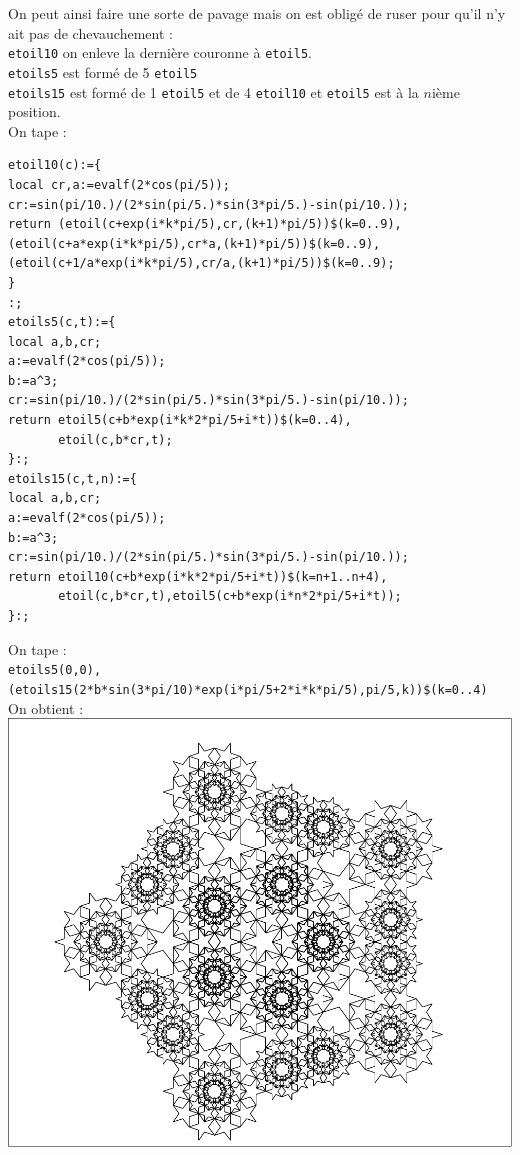 \documentclass[a4paper,11pt]{book}
\begin{document}
On peut ainsi faire une sorte de pavage mais on est oblig\'e de ruser pour qu'il
n'y ait pas de chevauchement :\\
{\tt etoil10} on enleve la derni\`ere couronne \`a {\tt etoil5}.\\
{\tt etoils5} est form\'e de 5 {\tt etoil5}\\
{\tt etoils15} est form\'e de 1 {\tt etoil5} et de 4 {\tt etoil10} et 
{\tt etoil5} est \`a la $n$i\`eme position.\\
On tape :\\
\begin{verbatim}
etoil10(c):={
local cr,a:=evalf(2*cos(pi/5));
cr:=sin(pi/10.)/(2*sin(pi/5.)*sin(3*pi/5.)-sin(pi/10.));
return (etoil(c+exp(i*k*pi/5),cr,(k+1)*pi/5))$(k=0..9),
(etoil(c+a*exp(i*k*pi/5),cr*a,(k+1)*pi/5))$(k=0..9),
(etoil(c+1/a*exp(i*k*pi/5),cr/a,(k+1)*pi/5))$(k=0..9);
}
:;
etoils5(c,t):={
local a,b,cr;
a:=evalf(2*cos(pi/5));
b:=a^3;
cr:=sin(pi/10.)/(2*sin(pi/5.)*sin(3*pi/5.)-sin(pi/10.));
return etoil5(c+b*exp(i*k*2*pi/5+i*t))$(k=0..4),
       etoil(c,b*cr,t);
}:;
etoils15(c,t,n):={
local a,b,cr;
a:=evalf(2*cos(pi/5));
b:=a^3;
cr:=sin(pi/10.)/(2*sin(pi/5.)*sin(3*pi/5.)-sin(pi/10.));
return etoil10(c+b*exp(i*k*2*pi/5+i*t))$(k=n+1..n+4),
       etoil(c,b*cr,t),etoil5(c+b*exp(i*n*2*pi/5+i*t));
}:;
\end{verbatim}
On tape :\\
{\tt etoils5(0,0),(etoils15(2*b*sin(3*pi/10)*exp(i*pi/5+2*i*k*pi/5),pi/5,k))\$(k=0..4)}\\
On obtient :\\
\includegraphics[width=\textwidth]{casetoil5}
\end{document}
